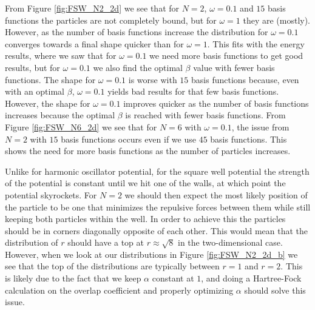 \documentclass[../main.tex]{subfiles}
\begin{document}
From Figure \ref{fig:FSW_N2_2d} we see that for $N=2$, $\omega = 0.1$ and $15$ basis functions the particles are not completely bound, but for $\omega = 1$ they are (mostly). However, as the number of basis functions increase the distribution for $\omega = 0.1$ converges towards a final shape quicker than for $\omega = 1$. This fits with the energy results, where we saw that for $\omega = 0.1$ we need more basis functions to get good results, but for $\omega = 0.1$ we also find the optimal $\beta$ value with fewer basis functions. The shape for $\omega = 0.1$ is worse with $15$ basis functions because, even with an optimal $\beta$, $\omega = 0.1$ yields bad results for that few basis functions. However, the shape for $\omega = 0.1$ improves quicker as the number of basis functions increases because the optimal $\beta$ is reached with fewer basis functions. From Figure \ref{fig:FSW_N6_2d} we see that for $N=6$ with $\omega = 0.1$, the issue from $N=2$ with $15$ basis functions occurs even if we use $45$ basis functions. This shows the need for more basis functions as the number of particles increases.

Unlike for harmonic oscillator potential, for the square well potential the strength of the potential is constant until we hit one of the walls, at which point the potential skyrockets. For $N=2$ we should then expect the most likely position of the particle to be one that minimizes the repulsive forces between them while still keeping both particles within the well. In order to achieve this the particles should be in corners diagonally opposite of each other. This would mean that the distribution of $r$ should have a top at $r \approx \sqrt{8}$ in the two-dimensional case. However, when we look at our distributions in Figure \ref{fig:FSW_N2_2d_b} we see that the top of the distributions are typically between $r=1$ and $r=2$. This is likely due to the fact that we keep $\alpha$ constant at $1$, and doing a Hartree-Fock calculation on the overlap coefficient and properly optimizing $\alpha$ should solve this issue.
\end{document}
